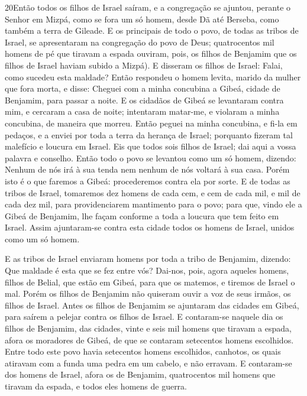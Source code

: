\lettrine{20} Então todos os filhos de Israel saíram, e a
congregação se ajuntou, perante o Senhor em Mizpá, como se fora um
só homem, desde Dã até Berseba, como também a terra de Gileade.
E os principais de todo o povo, de todas as tribos de Israel, se
apresentaram na congregação do povo de Deus; quatrocentos mil homens
de pé que tiravam a espada ouviram, pois, os filhos de Benjamim
que os filhos de Israel haviam subido a Mizpá). E disseram os filhos
de Israel: Falai, como sucedeu esta maldade? Então respondeu o
homem levita, marido da mulher que fora morta, e disse: Cheguei com
a minha concubina a Gibeá, cidade de Benjamim, para passar a noite.
E os cidadãos de Gibeá se levantaram contra mim, e cercaram a
casa de noite; intentaram matar-me, e violaram a minha concubina, de
maneira que morreu. Então peguei na minha concubina, e fi-la em
pedaços, e a enviei por toda a terra da herança de Israel; porquanto
fizeram tal malefício e loucura em Israel. Eis que todos sois
filhos de Israel; dai aqui a vossa palavra e conselho. Então
todo o povo se levantou como um só homem, dizendo: Nenhum de nós irá
à sua tenda nem nenhum de nós voltará à sua casa. Porém isto é o
que faremos a Gibeá: procederemos contra ela por sorte. E de
todas as tribos de Israel, tomaremos dez homens de cada cem, e cem
de cada mil, e mil de cada dez mil, para providenciarem mantimento
para o povo; para que, vindo ele a Gibeá de Benjamim, lhe façam
conforme a toda a loucura que tem feito em Israel. Assim
ajuntaram-se contra esta cidade todos os homens de Israel, unidos
como um só homem.

E as tribos de Israel enviaram homens por toda a tribo de
Benjamim, dizendo: Que maldade é esta que se fez entre vós?
Dai-nos, pois, agora aqueles homens, filhos de Belial, que
estão em Gibeá, para que os matemos, e tiremos de Israel o mal.
Porém os filhos de Benjamim não quiseram ouvir a voz de seus irmãos,
os filhos de Israel. Antes os filhos de Benjamim se ajuntaram
das cidades em Gibeá, para saírem a pelejar contra os filhos de
Israel. E contaram-se naquele dia os filhos de Benjamim, das
cidades, vinte e seis mil homens que tiravam a espada, afora os
moradores de Gibeá, de que se contaram setecentos homens escolhidos.
Entre todo este povo havia setecentos homens escolhidos,
canhotos, os quais atiravam com a funda uma pedra em um cabelo, e
não erravam. E contaram-se dos homens de Israel, afora os de
Benjamim, quatrocentos mil homens que tiravam da espada, e todos
eles homens de guerra.

